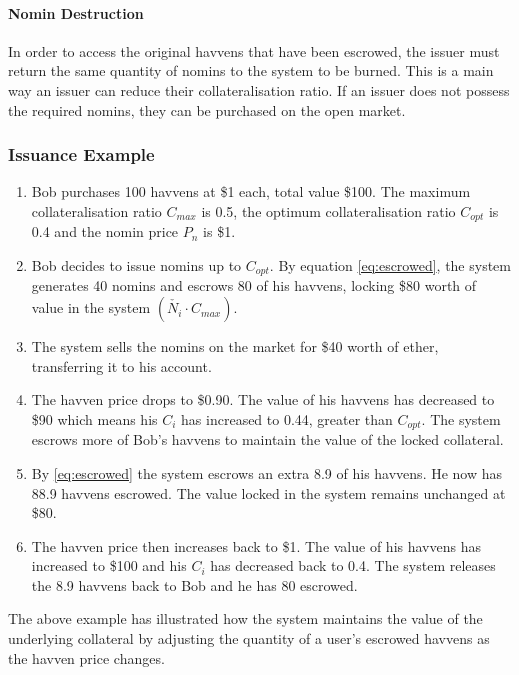 \paragraph{Nomin Destruction}

\noindent In order to access the original havvens that have been escrowed, the issuer must return the same quantity of nomins to the system to be burned. This is a main way 
an issuer can reduce their collateralisation ratio. If an issuer does not possess the required nomins, they can be purchased on the open market.

\subsubsection{Issuance Example}

\begin{enumerate}
\item{Bob purchases 100 havvens at \$1 each, total value \$100. The maximum collateralisation ratio $C_{max}$ is 0.5, the optimum collateralisation ratio $C_{opt}$ is 0.4 and the nomin price $P_n$ is \$1.}
\item{Bob decides to issue nomins up to $C_{opt}$. By equation \eqref{eq:escrowed}, the system generates 40 nomins and escrows 80 of his havvens, locking \$80 worth of value in the system $ (\check{N_i} \cdot C_{max})$.}
\item{The system sells the nomins on the market for \$40 worth of ether, transferring it to his account}.
\item{The havven price drops to \$0.90. The value of his havvens has decreased to \$90 which means his $C_i$ has increased to 0.44, greater than $C_{opt}$. The system escrows more of Bob's havvens to maintain the value of the locked collateral.}
\item{By \eqref{eq:escrowed} the system escrows an extra 8.9 of his havvens. He now has 88.9 havvens escrowed. The value locked in the system remains unchanged at \$80.}
\item{The havven price then increases back to \$1. The value of his havvens has increased to \$100 and his $C_i$ has decreased back to 0.4. The system releases the 8.9 havvens back to Bob and he has 80 escrowed.}
\end{enumerate}

\noindent The above example has illustrated how the system maintains the value of the underlying collateral by adjusting the quantity of a user's escrowed havvens as the havven price changes.

